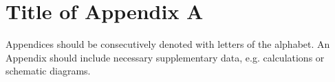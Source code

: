 \chapter{Title of Appendix A}
Appendices should be consecutively denoted with letters of the alphabet. An Appendix should include necessary supplementary data, e.g. calculations or schematic diagrams.